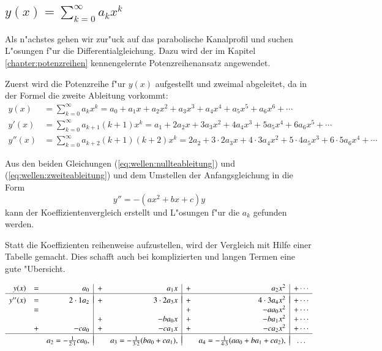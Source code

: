 \subsection{\texorpdfstring{$y(x) = \sum_{k = 0}^{\infty} a_{k}x^k$}{y(x) = 
summe k = 0 bis unendlich ak xk}}
\label{subsec:wellen:Potenzreihenansatz}

Als n"achstes gehen wir zur"uck auf das parabolische Kanalprofil und suchen 
L"osungen f"ur die Differentialgleichung. Dazu wird der im Kapitel 
\ref{chapter:potenzreihen} kennengelernte Potenzreihenansatz angewendet.

Zuerst wird die Potenzreihe f"ur $y(x)$ aufgestellt und zweimal abgeleitet, da 
in der Formel die zweite Ableitung vorkommt:
\begin{align}
	y(x)
	&=
	\sum_{k = 0}^{\infty} a_{k}x^k
	=
	a_0 + a_1x + a_2x^2 + a_3x^3 + a_4x^4 + a_5x^5 + a_6x^6 + \dotsb
	\label{eq:wellen:nullteableitung}
	\\
	y'(x)
	&=
	\sum_{k=0}^{\infty} a_{k+1}(k+1)x^k
	=
	a_1 + 2a_2x + 3a_3x^2 + 4a_4x^3 + 5a_5x^4 + 6a_6x^5+ \dotsb
	\\
	y''(x)
	&=
	\sum_{k = 0}^{\infty} a_{k+2}(k+1)(k+2)x^k
	=
	2a_2 + 3 \mathbin{\cdot} 2a_3x + 4 \mathbin{\cdot} 3a_4x^2 + 5 
	\mathbin{\cdot} 4a_5x^3 + 6 \mathbin{\cdot} 5a_6x^4 + \dotsb
	\label{eq:wellen:zweiteableitung}
\end{align}
 
Aus den beiden Gleichungen (\ref{eq:wellen:nullteableitung}) und
(\ref{eq:wellen:zweiteableitung}) und dem Umstellen der Anfangsgleichung in die 
Form
\begin{equation*}
	y'' = -(ax^2+bx+c)y
\end{equation*}
kann der Koeffizientenvergleich erstellt und L"osungen f"ur die $a_k$ gefunden 
werden. 

Statt die Koeffizienten reihenweise aufzustellen, wird der Vergleich 
mit Hilfe einer Tabelle gemacht. Dies schafft auch bei komplizierten und langen 
Termen eine gute "Ubersicht.

\begin{equation}
	\begin{array}{r c r | c r | c r | c r c}
	y(x) & = &
	a_0 & + & a_1x & + & a_2x^2 & + \dotsb
	\\
	\hline&&&&&&&\\[-2ex]
	y''(x) & = &
	2\cdot1 a_2 & + & 3\cdot2 a_3x & + & 4\cdot3 a_4x^2 & + \dotsb
	\\
	& = &
	& & & + &- aa_0x^2 & + \dotsb
	\\
	& &
	& + &- ba_0x & + &- ba_1x^2 & + \dotsb
	\\
	& + &
	-ca_0 & + &- ca_1x & + &- ca_2x^2 & + \dotsb
	\\
	\hline&&&&&&&\\[-2ex]
	& &
	a_2 = -\frac{1}{2 \cdot 1}ca_0,
	& & a_3 = -\frac{1}{3 \cdot 2}(ba_0+ca_1),
	& & a_4 = -\frac{1}{4 \cdot 3}(aa_0+ba_1+ca_2),
	& \dots
	\end{array}
	\label{eq:wellen:koeffizietenvergleichtabelle}
\end{equation}

